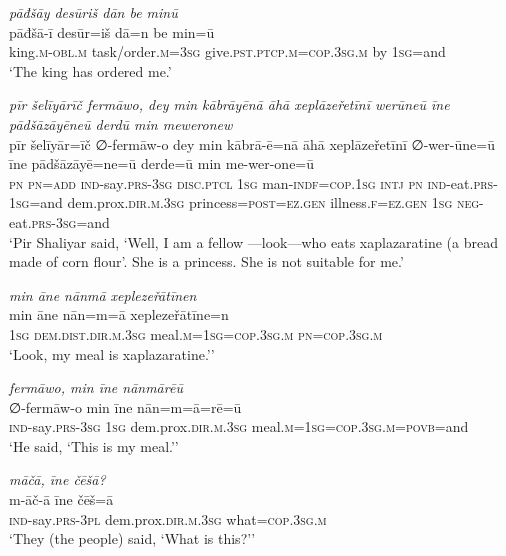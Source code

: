 \ea \label{ŽP.209}
\textit{pāđšāy desūriš dān be minū} \\ 
\gll pāđšā-ī desūr=iš dā=n be min=ū \\ 
 king\textsc{.m}\textsc{-obl}\textsc{.m} task/order\textsc{.m}\textsc{=3sg} give\textsc{.pst}\textsc{.ptcp}\textsc{.m}\textsc{=cop}\textsc{.3sg}\textsc{.m} by \textsc{1sg}=and \\ 
\glt `The king has ordered me.'
\z 
 
\ea \label{ŽP.210}
\textit{pīr šelīyārīč fermāwo, dey min kābrāyēnā āhā xeplāzeřetīnī werūneū īne pādšāzāyēneū derdū min meweronew} \\ 
\gll pīr šelīyār=īč ∅-fermāw-o dey min kābrā-ē=nā āhā xeplāzeřetīnī ∅-wer-ūne=ū īne pādšāzāyē=ne=ū derde=ū min me-wer-one=ū \\ 
 \textsc{pn} \textsc{pn}\textsc{=add} \textsc{ind-}say\textsc{.prs}\textsc{-3sg} \textsc{disc.ptcl} \textsc{1sg} man\textsc{-indf}\textsc{=cop}\textsc{.\textsc{1sg}} \textsc{intj} \textsc{pn} \textsc{ind-}eat\textsc{.prs}\textsc{-\textsc{1sg}}=and dem.prox\textsc{.dir}\textsc{.m}\textsc{.3sg} princess\textsc{=\textsc{post}}\textsc{\textsc{=ez.gen}} illness\textsc{.f}\textsc{\textsc{=ez.gen}} \textsc{1sg} \textsc{neg-}eat\textsc{.prs}\textsc{-3sg}=and \\ 
\glt `Pir Shaliyar said, ‘Well, I am a fellow —look—who eats xaplazaratine (a bread made of corn flour’. She is a princess. She is not suitable for me.'
\z 
 
\ea \label{ŽP.214}
\textit{min āne nānmā xeplezeřātīnen} \\ 
\gll min āne nān=m=ā xeplezeřātīne=n \\ 
 \textsc{1sg} \textsc{dem.dist}\textsc{.dir}\textsc{.m}\textsc{.3sg} meal\textsc{.m}\textsc{=\textsc{1sg}}\textsc{=cop}\textsc{.3sg}\textsc{.m} \textsc{pn}\textsc{=cop}\textsc{.3sg}\textsc{.m} \\ 
\glt `Look, my meal is xaplazaratine.’'
\z 
 
\ea \label{ŽP.217}
\textit{fermāwo, min īne nānmārēū} \\ 
\gll ∅-fermāw-o min īne nān=m=ā=rē=ū \\ 
 \textsc{ind-}say\textsc{.prs}\textsc{-3sg} \textsc{1sg} dem.prox\textsc{.dir}\textsc{.m}\textsc{.3sg} meal\textsc{.m}\textsc{=\textsc{1sg}}\textsc{=cop}\textsc{.3sg}\textsc{.m}\textsc{=\textsc{povb}}=and \\ 
\glt `He said, ‘This is my meal.’'
\z 
 
\ea \label{ŽP.222}
\textit{māčā, īne čēšā?} \\ 
\gll m-āč-ā īne čēš=ā \\ 
 \textsc{ind-}say\textsc{.prs}\textsc{-3pl} dem.prox\textsc{.dir}\textsc{.m}\textsc{.3sg} what\textsc{=cop}\textsc{.3sg}\textsc{.m} \\ 
\glt `They (the people) said, ‘What is this?’'
\z 
 
